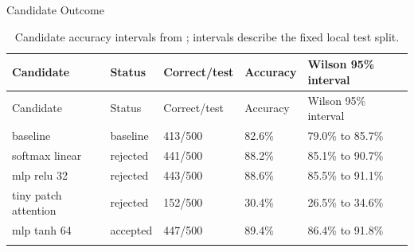 \documentclass[
  ignorenonframetext,
]{beamer}
\begin{document}
\begin{frame}{Candidate Outcome}
\begin{longtable}[]{@{}lllll@{}}
\caption{Candidate accuracy intervals from
\protect{}; intervals
describe the fixed local test
split.}\label{tbl:candidate-intervals}\tabularnewline
\toprule\noalign{}
Candidate & Status & Correct/test & Accuracy & Wilson 95\% interval \\
\midrule\noalign{}
\endfirsthead
\toprule\noalign{}
Candidate & Status & Correct/test & Accuracy & Wilson 95\% interval \\
\midrule\noalign{}
\endhead
baseline & baseline & 413/500 & 82.6\% & 79.0\% to 85.7\% \\
softmax linear & rejected & 441/500 & 88.2\% & 85.1\% to 90.7\% \\
mlp relu 32 & rejected & 443/500 & 88.6\% & 85.5\% to 91.1\% \\
tiny patch attention & rejected & 152/500 & 30.4\% & 26.5\% to 34.6\% \\
mlp tanh 64 & accepted & 447/500 & 89.4\% & 86.4\% to 91.8\% \\
\bottomrule\noalign{}
\end{longtable}


\end{frame}
\end{document}
